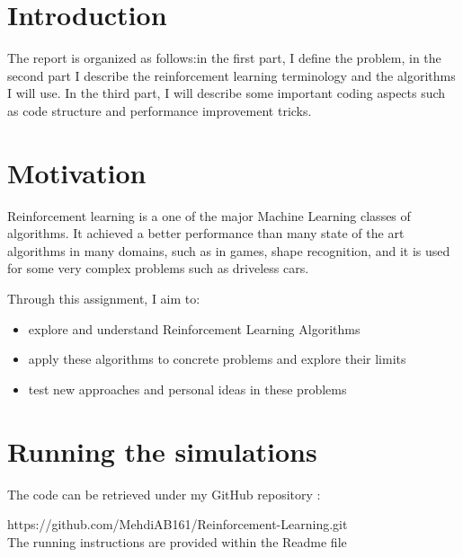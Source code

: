 \documentclass[12pt,a4paper]{article}
\begin{document}
\newpage
\tableofcontents


\newpage

\section*{Introduction}

The report is organized as follows:in the first part, I define the problem, in the second part I describe the reinforcement learning terminology and the algorithms I will use. In the third part, I will describe some important coding aspects such as code structure and performance improvement tricks.

\section*{Motivation}
Reinforcement learning is a one of the major Machine Learning classes of algorithms. It achieved a better performance than many state of the art algorithms in many domains, such as in games\cite{mnih-dqn-2015}\cite{44806}, shape recognition\cite{DBLP:journals/corr/RezendeEMBJH16}, and it is used for some very complex problems such as driveless cars.

Through this assignment, I aim to:
\begin{itemize}
\item explore and understand Reinforcement Learning Algorithms
\item apply these algorithms to concrete problems and explore their limits
\item test new approaches and personal ideas in these problems
 \end{itemize}

\section*{Running the simulations}
The code can be retrieved under my GitHub repository :

https://github.com/MehdiAB161/Reinforcement-Learning.git
\\The running instructions are provided within the Readme file


\end{document}
